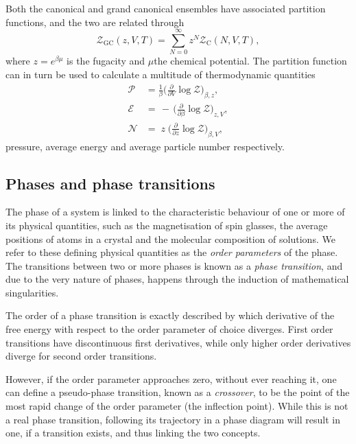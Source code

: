Both the canonical and grand canonical ensembles have associated partition
functions, and the two are related through
%
\begin{equation}
  \mathcal{Z}_{\text{GC}}(z, V, T) = \sum_{N=0}^{\infty} z^N \mathcal{Z}_{\text{C}}(N, V, T),
\end{equation}
%
where $z = e^{\beta \mu}$ is the fugacity and $\mu$the chemical
potential. The partition function can in turn be used to calculate a multitude
of thermodynamic quantities
%
\begin{align}
  \mathcal{P} &= \frac{1}{\beta} \bigg( \frac{\partial}{\partial V} \log \mathcal{Z}
    \bigg)_{\beta,z}, \\
  \mathcal{E} &= \,\minus\, \bigg( \frac{\partial}{\partial \beta}
    \log \mathcal{Z} \bigg)_{z,V}, \\
  \mathcal{N} &= \;z\; \bigg( \frac{\partial}{\partial z}
    \log \mathcal{Z} \bigg)_{\beta,V},
\end{align}
%
pressure, average energy and average particle number respectively.

\subsection{Phases and phase transitions}

The phase of a system is linked to the characteristic behaviour of one or more
of its physical quantities, such as the magnetisation of spin glasses, the
average positions of atoms in a crystal and the molecular composition of
solutions. We refer to these defining physical quantities as the
\emph{order parameters} of the phase.  The transitions between two or more phases
is known as a \emph{phase transition}, and due to the very nature of phases,
happens through the induction of mathematical singularities. 

The order of a phase transition is exactly described by which derivative of the
free energy with respect to the order parameter of choice diverges. First order
transitions have discontinuous first derivatives, while only higher order
derivatives diverge for second order transitions.

However, if the order parameter approaches zero, without ever reaching it,
one can define a pseudo-phase transition, known as a \emph{crossover}, to be the
point of the most rapid change of the order parameter (the inflection point).
While this is not a real phase transition, following its trajectory in a phase
diagram will result in one, if a transition exists, and thus linking the two
concepts.

